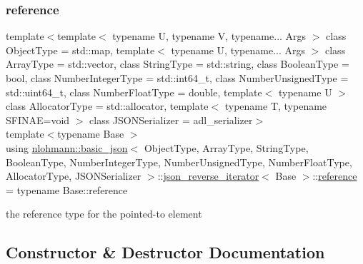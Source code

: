 \subsubsection{\texorpdfstring{reference}{reference}}
{\footnotesize\ttfamily template$<$template$<$ typename U, typename V, typename... Args $>$ class Object\+Type = std\+::map, template$<$ typename U, typename... Args $>$ class Array\+Type = std\+::vector, class String\+Type  = std\+::string, class Boolean\+Type  = bool, class Number\+Integer\+Type  = std\+::int64\+\_\+t, class Number\+Unsigned\+Type  = std\+::uint64\+\_\+t, class Number\+Float\+Type  = double, template$<$ typename U $>$ class Allocator\+Type = std\+::allocator, template$<$ typename T, typename S\+F\+I\+N\+A\+E=void $>$ class J\+S\+O\+N\+Serializer = adl\+\_\+serializer$>$ \\
template$<$typename Base $>$ \\
using \hyperlink{classnlohmann_1_1basic__json}{nlohmann\+::basic\+\_\+json}$<$ Object\+Type, Array\+Type, String\+Type, Boolean\+Type, Number\+Integer\+Type, Number\+Unsigned\+Type, Number\+Float\+Type, Allocator\+Type, J\+S\+O\+N\+Serializer $>$\+::\hyperlink{classnlohmann_1_1basic__json_1_1json__reverse__iterator}{json\+\_\+reverse\+\_\+iterator}$<$ Base $>$\+::\hyperlink{classnlohmann_1_1basic__json_1_1json__reverse__iterator_ab0021ef2007fd338615360af404dcd4e}{reference} =  typename Base\+::reference}



the reference type for the pointed-\/to element 



\subsection{Constructor \& Destructor Documentation}
\mbox{\label{classnlohmann_1_1basic__json_1_1json__reverse__iterator_a1270fe04d4801caf51e7464273305ba8}} 
